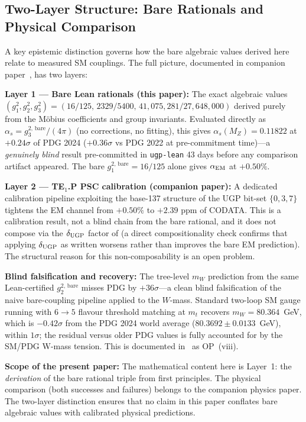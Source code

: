 \documentclass[11pt,twocolumn]{article}
\begin{document}
\subsection{Two-Layer Structure: Bare Rationals and Physical Comparison}
\label{subsec:two_layer}

A key epistemic distinction governs how the bare algebraic values derived here relate to measured SM couplings. The full picture, documented in companion paper~\cite{SpivackUGPFormalization}, has two layers:

\textbf{Layer 1 — Bare Lean rationals (this paper):} The exact algebraic values $(g_1^2, g_2^2, g_3^2) = (16/125,\, 2329/5400,\, 41{,}075{,}281/27{,}648{,}000)$ derived purely from the Möbius coefficients and group invariants. Evaluated directly as $\alpha_s = g_3^{2,\,\text{bare}}/(4\pi)$ (no corrections, no fitting), this gives $\alpha_s(M_Z) = 0.11822$ at $+0.24\sigma$ of PDG 2024 ($+0.36\sigma$ vs PDG 2022 at pre-commitment time)—a \emph{genuinely blind} result pre-committed in \texttt{ugp-lean} 43 days before any comparison artifact appeared. The bare $g_1^{2,\,\text{bare}} = 16/125$ alone gives $\alpha_{\rm EM}$ at $+0.50\%$.

\textbf{Layer 2 — TE$_1$.P PSC calibration (companion paper):} A dedicated calibration pipeline exploiting the base-137 structure of the UGP bit-set $\{0,3,7\}$ tightens the EM channel from $+0.50\%$ to $+2.39$ ppm of CODATA. This is a calibration result, not a blind chain from the bare rational, and it does not compose via the $\delta_{\rm UGP}$ factor of  (a direct compositionality check confirms that applying $\delta_{\rm UGP}$ as written worsens rather than improves the bare EM prediction). The structural reason for this non-composability is an open problem.

\textbf{Blind falsification and recovery:} The tree-level $m_W$ prediction from the same Lean-certified $g_2^{2,\,\text{bare}}$ misses PDG by $+36\sigma$—a clean blind falsification of the naive bare-coupling pipeline applied to the $W$-mass. Standard two-loop SM gauge running with $6{\to}5$ flavour threshold matching at $m_t$ recovers $m_W = 80.364$~GeV, which is $-0.42\sigma$ from the PDG 2024 world average ($80.3692 \pm 0.0133$~GeV), within $1\sigma$; the residual versus older PDG values is fully accounted for by the SM/PDG W-mass tension. This is documented in~\cite{SpivackUGPFormalization} as OP~(viii).

\textbf{Scope of the present paper:} The mathematical content here is Layer~1: the \emph{derivation} of the bare rational triple from first principles. The physical comparison (both successes and failures) belongs to the companion physics paper. The two-layer distinction ensures that no claim in this paper conflates bare algebraic values with calibrated physical predictions.
\end{document}
